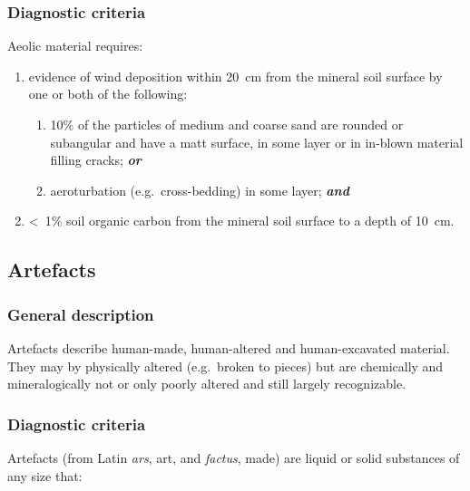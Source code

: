 \documentclass[
  letterpaper,
  DIV=11,
  numbers=noendperiod]{scrreprt}
\providecommand{\tightlist}{%
  \setlength{\itemsep}{0pt}\setlength{\parskip}{0pt}}\usepackage{longtable,booktabs,array}
\begin{document}
\hypertarget{diagnostic-criteria-57}{%
\subsubsection{Diagnostic criteria}\label{diagnostic-criteria-57}}

Aeolic material requires:

\begin{enumerate}
\def\labelenumi{\arabic{enumi}.}
\tightlist
\item
  evidence of wind deposition within 20~cm from the mineral soil surface
  by one or both of the following:

  \begin{enumerate}
  \def\labelenumii{\alph{enumii}.}
  \tightlist
  \item
    10\% of the particles of medium and coarse sand are rounded or
    subangular and have a matt surface, in some layer or in in-blown
    material filling cracks; \textbf{\emph{or}}
  \item
    aeroturbation (e.g.~cross-bedding) in some layer;
    \textbf{\emph{and}}
  \end{enumerate}
\item
  \textless~1\% soil organic carbon from the mineral soil surface to a
  depth of 10~cm.
\end{enumerate}

\hypertarget{artefacts}{%
\subsection{Artefacts}\label{artefacts}}

\hypertarget{general-description-56}{%
\subsubsection{General description}\label{general-description-56}}

Artefacts describe human-made, human-altered and human-excavated
material. They may by physically altered (e.g.~broken to pieces) but are
chemically and mineralogically not or only poorly altered and still
largely recognizable.

\hypertarget{diagnostic-criteria-58}{%
\subsubsection{Diagnostic criteria}\label{diagnostic-criteria-58}}

Artefacts (from Latin \emph{ars}, art, and \emph{factus}, made) are
liquid or solid substances of any size that:
\end{document}
